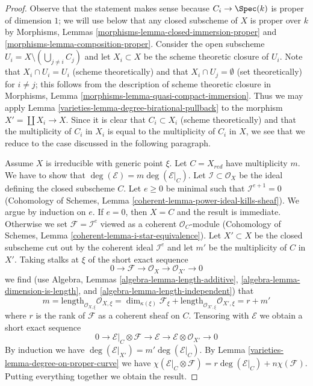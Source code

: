 \begin{proof}

Observe that the statement makes sense because $C_i \to \Spec(k)$
is proper of dimension $1$; we will use below that any closed subscheme
of $X$ is proper over $k$ by Morphisms, Lemmas
\ref{morphisms-lemma-closed-immersion-proper} and
\ref{morphisms-lemma-composition-proper}. Consider the open subscheme
$U_i = X \setminus (\bigcup_{j \not = i} C_j)$ and let $X_i \subset X$
be the scheme theoretic closure of $U_i$. Note that $X_i \cap U_i = U_i$
(scheme theoretically) and that $X_i \cap U_j = \emptyset$
(set theoretically) for $i \not = j$; this follows from the description
of scheme theoretic closure in
Morphisms, Lemma \ref{morphisms-lemma-quasi-compact-immersion}.
Thus we may apply Lemma \ref{varieties-lemma-degree-birational-pullback} to the morphism
$X' = \coprod X_i \to X$. Since it is clear that $C_i \subset X_i$
(scheme theoretically) and that the multiplicity of $C_i$ in $X_i$ is equal
to the multiplicity of $C_i$ in $X$, we see that we reduce to the case
discussed in the following paragraph.

\medskip\noindent
Assume $X$ is irreducible with generic point $\xi$. Let
$C = X_{red}$ have multiplicity $m$.
We have to show that $\deg(\mathcal{E}) = m \deg(\mathcal{E}|_C)$.
Let $\mathcal{I} \subset \mathcal{O}_X$ be the ideal defining the closed
subscheme $C$. Let $e \geq 0$ be minimal such that $\mathcal{I}^{e + 1} = 0$
(Cohomology of Schemes, Lemma \ref{coherent-lemma-power-ideal-kills-sheaf}).
We argue by induction on $e$. If $e = 0$, then $X = C$ and the result
is immediate. Otherwise we set $\mathcal{F} = \mathcal{I}^e$ viewed as
a coherent $\mathcal{O}_C$-module (Cohomology of Schemes, Lemma
\ref{coherent-lemma-i-star-equivalence}).
Let $X' \subset X$ be the closed subscheme cut out by the
coherent ideal $\mathcal{I}^e$ and let $m'$ be the multiplicity
of $C$ in $X'$. Taking stalks at $\xi$ of the short exact sequence
$$
0 \to \mathcal{F} \to \mathcal{O}_X \to \mathcal{O}_{X'} \to 0
$$
we find (use Algebra, Lemmas \ref{algebra-lemma-length-additive},
\ref{algebra-lemma-dimension-is-length}, and
\ref{algebra-lemma-length-independent}) that
$$
m = \text{length}_{\mathcal{O}_{X, \xi}} \mathcal{O}_{X, \xi}
= \dim_{\kappa(\xi)} \mathcal{F}_\xi +
\text{length}_{\mathcal{O}_{X', \xi}} \mathcal{O}_{X', \xi}
= r + m'
$$
where $r$ is the rank of $\mathcal{F}$ as a coherent sheaf on $C$.
Tensoring with $\mathcal{E}$ we obtain a short exact sequence
$$
0 \to \mathcal{E}|_C \otimes \mathcal{F} \to \mathcal{E} \to
\mathcal{E} \otimes \mathcal{O}_{X'} \to 0
$$
By induction we have
$\deg(\mathcal{E}|_{X'}) = m' \deg(\mathcal{E}|_C)$.
By Lemma \ref{varieties-lemma-degree-on-proper-curve} we have
$\chi(\mathcal{E}|_C \otimes \mathcal{F}) =
r \deg(\mathcal{E}|_C) + n \chi(\mathcal{F})$.
Putting everything together we obtain the result.
\end{proof}

